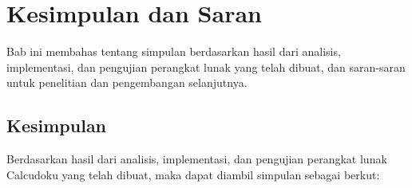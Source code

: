 \chapter{Kesimpulan dan Saran}
\label{chap:simpulansaran}

Bab ini membahas tentang simpulan berdasarkan hasil dari analisis, implementasi, dan pengujian perangkat lunak yang telah dibuat, dan saran-saran untuk penelitian dan pengembangan selanjutnya.

\section{Kesimpulan}
\label{sec:simpulan}

Berdasarkan hasil dari analisis, implementasi, dan pengujian perangkat lunak Calcudoku yang telah dibuat, maka dapat diambil simpulan sebagai berkut:

